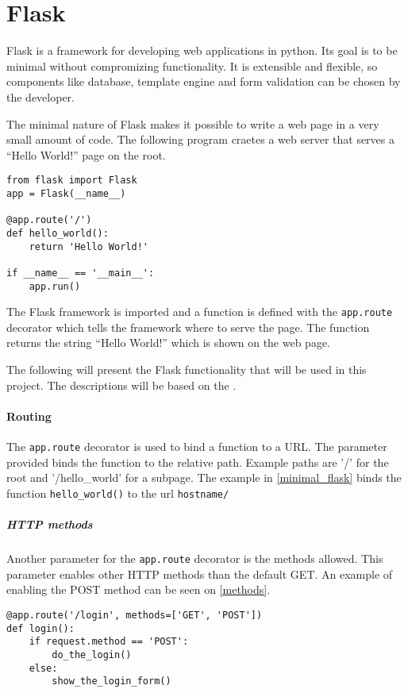 \section{Flask}
Flask is a framework for developing web applications in python\citep{flask_official}.
Its goal is to be minimal without compromizing functionality.
It is extensible and flexible, so components like database, template engine and form validation can be chosen by the developer.

The minimal nature of Flask makes it possible to write a web page in a very small amount of code.
The following program craetes a web server that serves a ``Hello World!'' page on the root.

\begin{lstlisting}[style=python, caption='Minimal Flask application', label='minimal_flask']
from flask import Flask
app = Flask(__name__)

@app.route('/')
def hello_world():
    return 'Hello World!'

if __name__ == '__main__':
    app.run()
\end{lstlisting}

The Flask framework is imported and a function is defined with the \texttt{app.route} decorator which tells the framework where to serve the page.
The function returns the string ``Hello World!'' which is shown on the web page.

The following will present the Flask functionality that will be used in this project.
The descriptions will be based on the \citet{flask_docs}.

\paragraph{Routing}
The \texttt{app.route} decorator is used to bind a function to a URL.
The parameter provided binds the function to the relative path.
Example paths are '/' for the root and '/hello\_world' for a subpage.
The example in \cref{minimal_flask} binds the function \texttt{hello\_world()} to the  url \texttt{hostname/}

\subparagraph{HTTP methods} Another parameter for the \texttt{app.route} decorator is the methods allowed.
This parameter enables other HTTP methods than the default GET.
An example of enabling the POST method can be seen on \cref{methods}.

\begin{lstlisting}[style=python, caption='Enabling POST requests for a login form', label=methods]
@app.route('/login', methods=['GET', 'POST'])
def login():
    if request.method == 'POST':
        do_the_login()
    else:
        show_the_login_form()
\end{lstlisting}

